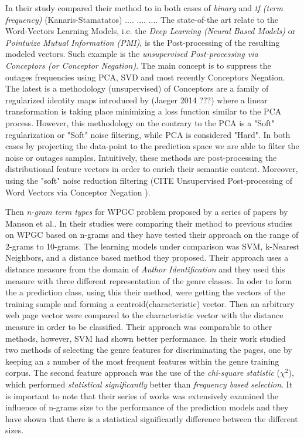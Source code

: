 In their study compared their method to in both cases of \textit{binary} and \textit{tf (term frequency)} (Kanaris-Stamatatos)
....
....
....
The state-of-the art relate to the Word-Vectors Learning Models, i.e. the \textit{Deep Learning (Neural Based Models)} or \textit{Pointwize Mutual Information (PMI)}, is the Post-processing of the resulting modeled vectors. Such example is the \textit{unsupervised Post-processing via Conceptors (or Conceptor Negation)}. The main concept is to suppress the outages frequencies using PCA, SVD and most recently Conceptors Negation. The latest is a methodology (unsupervised) of Conceptors are a family of regularized identity maps introduced by (Jaeger 2014 ???) where a linear transformation is taking place minimizing a loss function similar to the PCA process. However, this methodology on the contrary to the PCA is a "Soft" regularization or "Soft" noise filtering, while PCA is considered "Hard". In both cases by projecting the data-point to the prediction space we are able to filter the noise or outages samples. Intuitively, these methods are post-processing the distributional feature vectors in order to enrich their semantic content. Moreover, using the "soft" noise reduction filtering (CITE Unsupervised Post-processing of Word Vectors via Conceptor Negation ).

Then \textit{n-gram term types} for WPGC problem proposed by a series of papers by Manson et al.\parencite{mason2009n,mason2009classifying,mason2009distance}. In their studies were comparing their method to previous studies on WPGC based on n-grams and they have tested their approach on the range of 2-grams to 10-grams. The learning models under comparison was SVM, k-Nearest Neighbors, and a distance based method they proposed. Their approach uses a distance measure from the domain of \textit{Author Identification} and they used this measure with three different representation of the genre classes. In oder to form the a prediction class, using this their method, were getting the vectors of the training sample and forming a centroid(characteristic) vector. Then an arbitrary web page vector were compared to the characteristic vector with the distance measure in order to be classified. Their approach was comparable to other methods, however, SVM had shown better performance. In their work studied two methods of selecting the genre features for discriminating the pages, one by keeping an $z$ number of the most frequent features within the genre training corpus. The second feature approach was the use of the \textit{chi-square statistic} ($\chi^{2}$), which performed \textit{statistical significantly} better than \textit{frequency based selection}. It is important to note that their series of works was extensively examined the influence of n-grams size to the performance of the prediction models and they have shown that there is a statistical
significantly difference between the different sizes.

